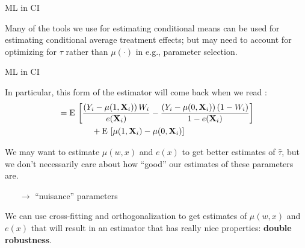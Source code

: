 \documentclass[xcolor={dvipsnames}, handout]{beamer}
\begin{document}

\begin{frame}{ML in CI}

\begin{wideitemize}
\item Many of the tools we use for estimating conditional means can be used for estimating conditional average treatment effects; but may need to account for optimizing for $\tau$ rather than $\mu(\cdot)$ in e.g., parameter selection. 
\end{wideitemize}

\end{frame}



\begin{frame}{ML in CI}

\begin{wideitemize}
\item In particular, this form of the estimator will come back when we read \cite{chernozhukov2018double, schuler2017targeted}:
\begin{align*}
      & = {\textrm E}\,\left[ \frac{\left(Y_i - \mu(1,\mathbf{X}_i)\right)  W_i}{e(\mathbf{X}_i)} - \frac{\left(Y_i - \mu(0,\mathbf{X}_i)\right) (1-W_i) }{1 - e(\mathbf{X}_i)}\right] \\
     & \qquad \qquad  + {\textrm E}\,\left[\mu(1,\mathbf{X}_i) - \mu(0,\mathbf{X}_i) \right]
\end{align*}\pause
\pause
\item We may want to estimate $\mu(w,x)$ and $e(x)$ to get better estimates of $\hat \tau$, but we don't necessarily care about how ``good'' our estimates of these parameters are. \pause
\begin{itemize}
\item[$\rightarrow$] ``nuisance'' parameters
\end{itemize}
\item We can use cross-fitting and orthogonalization to get estimates of $\mu(w,x)$ and $e(x)$ that will result in an estimator that has really nice properties: \textbf{double robustness}. 
\end{wideitemize}

\end{frame}
\end{document}
